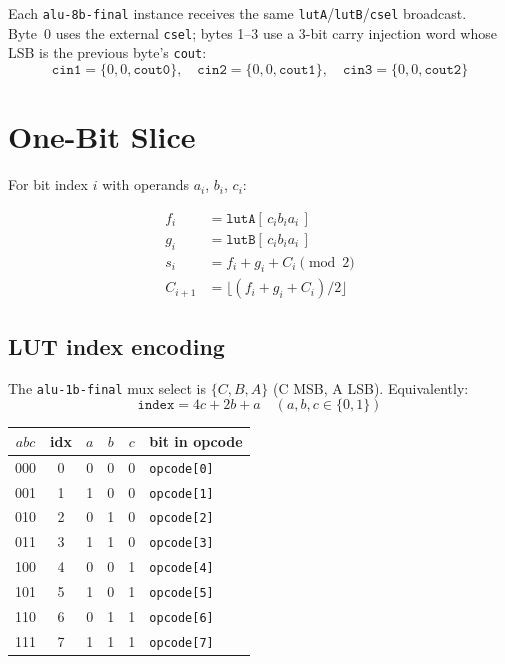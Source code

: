 \documentclass[10pt,a4paper]{article}
\begin{document}
Each \texttt{alu-8b-final} instance receives the same \texttt{lutA}/\texttt{lutB}/\texttt{csel} broadcast. Byte~0 uses the external \texttt{csel}; bytes 1--3 use a 3-bit carry injection word whose LSB is the previous byte's \texttt{cout}:
\[
  \texttt{cin1} = \{0,0,\texttt{cout0}\},\quad
  \texttt{cin2} = \{0,0,\texttt{cout1}\},\quad
  \texttt{cin3} = \{0,0,\texttt{cout2}\}
\]

\section{One-Bit Slice}

For bit index $i$ with operands $a_i$, $b_i$, $c_i$:

\begin{align*}
  f_i &= \texttt{lutA}[\,c_i b_i a_i\,] \\
  g_i &= \texttt{lutB}[\,c_i b_i a_i\,] \\
  s_i &= f_i + g_i + C_i \pmod 2 \\
  C_{i+1} &= \lfloor (f_i + g_i + C_i) / 2 \rfloor
\end{align*}

\subsection{LUT index encoding}

The \texttt{alu-1b-final} mux select is $\{C,B,A\}$ (C MSB, A LSB). Equivalently:
\[
  \texttt{index} = 4c + 2b + a \quad (a,b,c \in \{0,1\})
\]

\begin{center}
\scriptsize
\begin{tabular}{@{}cccccl@{}}
\toprule
\textbf{$abc$} & \textbf{idx} & \textbf{$a$} & \textbf{$b$} & \textbf{$c$} & \textbf{bit in opcode} \\
\midrule
000 & 0 & 0 & 0 & 0 & \texttt{opcode[0]} \\
001 & 1 & 1 & 0 & 0 & \texttt{opcode[1]} \\
010 & 2 & 0 & 1 & 0 & \texttt{opcode[2]} \\
011 & 3 & 1 & 1 & 0 & \texttt{opcode[3]} \\
100 & 4 & 0 & 0 & 1 & \texttt{opcode[4]} \\
101 & 5 & 1 & 0 & 1 & \texttt{opcode[5]} \\
110 & 6 & 0 & 1 & 1 & \texttt{opcode[6]} \\
111 & 7 & 1 & 1 & 1 & \texttt{opcode[7]} \\
\bottomrule
\end{tabular}
\end{center}
\end{document}
